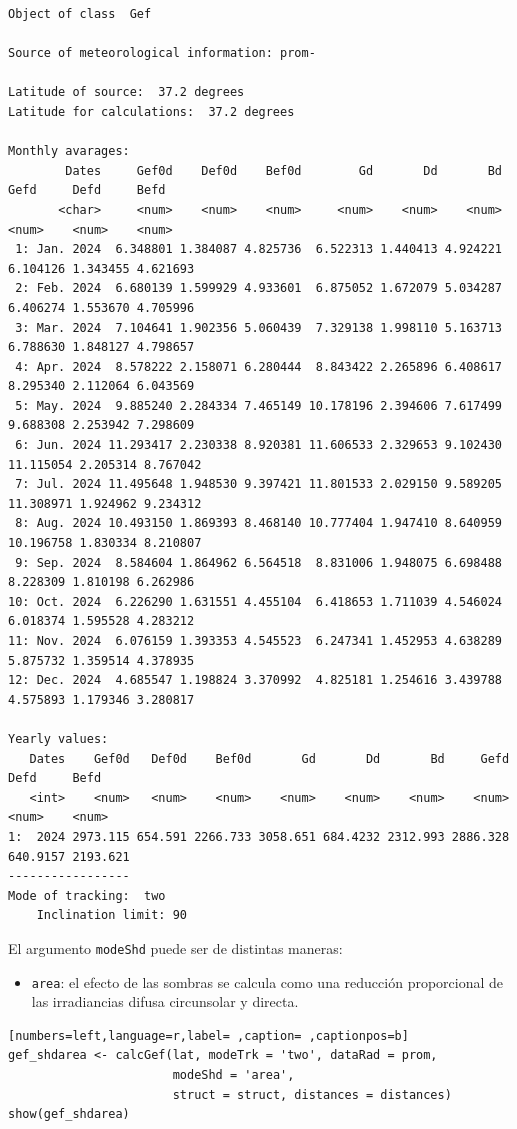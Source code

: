 \begin{verbatim}
Object of class  Gef 

Source of meteorological information: prom- 

Latitude of source:  37.2 degrees
Latitude for calculations:  37.2 degrees

Monthly avarages:
        Dates     Gef0d    Def0d    Bef0d        Gd       Dd       Bd      Gefd     Defd     Befd
       <char>     <num>    <num>    <num>     <num>    <num>    <num>     <num>    <num>    <num>
 1: Jan. 2024  6.348801 1.384087 4.825736  6.522313 1.440413 4.924221  6.104126 1.343455 4.621693
 2: Feb. 2024  6.680139 1.599929 4.933601  6.875052 1.672079 5.034287  6.406274 1.553670 4.705996
 3: Mar. 2024  7.104641 1.902356 5.060439  7.329138 1.998110 5.163713  6.788630 1.848127 4.798657
 4: Apr. 2024  8.578222 2.158071 6.280444  8.843422 2.265896 6.408617  8.295340 2.112064 6.043569
 5: May. 2024  9.885240 2.284334 7.465149 10.178196 2.394606 7.617499  9.688308 2.253942 7.298609
 6: Jun. 2024 11.293417 2.230338 8.920381 11.606533 2.329653 9.102430 11.115054 2.205314 8.767042
 7: Jul. 2024 11.495648 1.948530 9.397421 11.801533 2.029150 9.589205 11.308971 1.924962 9.234312
 8: Aug. 2024 10.493150 1.869393 8.468140 10.777404 1.947410 8.640959 10.196758 1.830334 8.210807
 9: Sep. 2024  8.584604 1.864962 6.564518  8.831006 1.948075 6.698488  8.228309 1.810198 6.262986
10: Oct. 2024  6.226290 1.631551 4.455104  6.418653 1.711039 4.546024  6.018374 1.595528 4.283212
11: Nov. 2024  6.076159 1.393353 4.545523  6.247341 1.452953 4.638289  5.875732 1.359514 4.378935
12: Dec. 2024  4.685547 1.198824 3.370992  4.825181 1.254616 3.439788  4.575893 1.179346 3.280817

Yearly values:
   Dates    Gef0d   Def0d    Bef0d       Gd       Dd       Bd     Gefd     Defd     Befd
   <int>    <num>   <num>    <num>    <num>    <num>    <num>    <num>    <num>    <num>
1:  2024 2973.115 654.591 2266.733 3058.651 684.4232 2312.993 2886.328 640.9157 2193.621
-----------------
Mode of tracking:  two 
    Inclination limit: 90
\end{verbatim}

El argumento \texttt{modeShd} puede ser de distintas maneras:
\begin{itemize}
\item \texttt{area}: el efecto de las sombras se calcula como una reducción proporcional de las irradiancias difusa circunsolar y directa.
\end{itemize}
\begin{lstlisting}[numbers=left,language=r,label= ,caption= ,captionpos=b]
gef_shdarea <- calcGef(lat, modeTrk = 'two', dataRad = prom,
                       modeShd = 'area',
                       struct = struct, distances = distances)
show(gef_shdarea)
\end{lstlisting}

